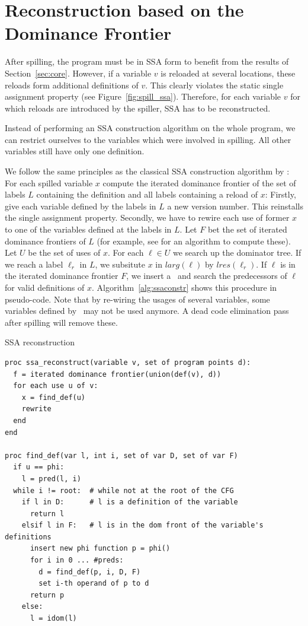 \section{Reconstruction based on the Dominance Frontier}
After spilling, the program must be in SSA form to benefit from the results of Section~\ref{sec:core}.
However, if a variable $v$ is reloaded at several locations, these reloads form additional definitions of $v$.
This clearly violates the static single assignment property (see Figure~\ref{fig:spill_ssa}).
Therefore, for each variable $v$ for which reloads are introduced by the spiller, SSA has to be reconstructed.

Instead of performing an SSA construction algorithm on the whole program, we can restrict ourselves to the variables which were involved in spilling. All other variables still have only one definition.

We follow the same principles as the classical SSA construction algorithm by \cite{cytron:1991:ssa}:
For each spilled variable $x$ compute the iterated dominance frontier of the set of labels $L$ containing the definition and all labels containing a reload of $x$:
Firstly, give each variable defined by the labels in $L$ a new version number.
This reinstalls the single assignment property. Secondly, we have to rewire each use of former $x$ to one of the variables defined at the labels in $L$. 
Let $F$ bet the set of iterated dominance frontiers of $L$ (for example, see \cite[page 406]{appel:2002:modern} for an algorithm to compute these).
Let $U$ be the set of uses of $x$.
For each $\ell\in U$ we search up the dominator tree.
If we reach a label $\ell_r$ in $L$, we subsitute $x$ in $larg(\ell)$ by $lres(\ell_r)$.
If $\ell$ is in the iterated dominance frontier $F$, we insert a \phiop\ and search the predecessors of $\ell$ for valid definitions of $x$.
Algorithm~\ref{alg:ssaconstr} shows this procedure in pseudo-code.
Note that by re-wiring the usages of several variables, some variables defined by \phiops\ may not be used anymore.
A dead code elimination pass after spilling will remove these. 

\begin{algorithm}
  \caption{SSA reconstruction}
  \label{alg:ssaconstr}

\begin{verbatim}
proc ssa_reconstruct(variable v, set of program points d):
  f = iterated dominance frontier(union(def(v), d))
  for each use u of v:
    x = find_def(u)
    rewrite 
  end
end

proc find_def(var l, int i, set of var D, set of var F)
  if u == phi:
    l = pred(l, i)
  while i != root:  # while not at the root of the CFG
    if l in D:      # l is a definition of the variable
      return l
    elsif l in F:   # l is in the dom front of the variable's definitions
      insert new phi function p = phi()
      for i in 0 ... #preds: 
        d = find_def(p, i, D, F)
        set i-th operand of p to d
	  return p
    else:
      l = idom(l)
\end{verbatim}
\end{algorithm}



